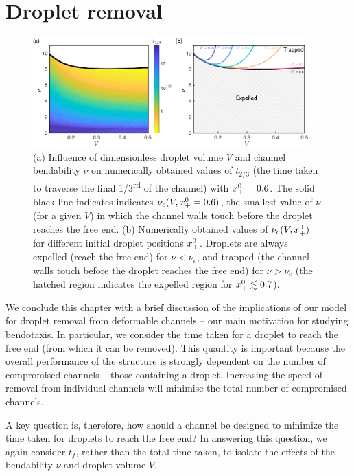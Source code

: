 \section{Droplet removal}
\begin{figure}
\centering
\includegraphics[width = 0.95\textwidth]{optimal_removal_split}
\caption{(a) Influence of dimensionless droplet volume $V$ and channel bendability $\nu$ on numerically obtained values of $t_{2/3}$ (the time taken to traverse the final 1/3\textsuperscript{rd} of the channel) with $x_{+}^0 = 0.6$. The solid black line indicates indicates $\nu_c(V,x_{+}^0 = 0.6)$, the smallest value of $\nu$ (for a given $V$) in which the channel walls touch before the droplet reaches the free end. (b) Numerically obtained values of $\nu_c(V,x_{+}^0)$ for different initial droplet positions $x_{+}^0$. Droplets are always expelled (reach the free end) for $\nu < \nu_c$, and trapped (the channel walls touch before the droplet reaches the free end) for $\nu > \nu_c$ (the hatched region indicates the expelled region for $x_{+}^0 \lesssim 0.7$).}
\label{fig:Ch2:DropRemoval}
\end{figure}
We conclude this chapter with a brief discussion of the implications of our model for droplet removal from deformable channels --  our main motivation for studying bendotaxis. In particular, we consider the time taken for a droplet to reach the free end (from which it can be removed). This quantity is important because the overall performance of the structure is strongly dependent on the number of compromised channels -- those containing a droplet. Increasing the speed of removal from individual channels will minimise the total number of compromised channels.

A key question is, therefore, how should a channel be designed to minimize the time taken for droplets to reach the free end? In answering this question, we again consider $t_f$, rather than the total time taken, to isolate the effects of the bendability $\nu$ and droplet volume $V$.

